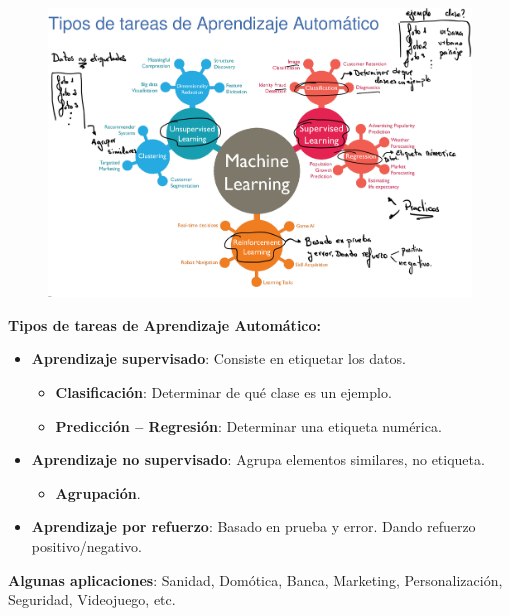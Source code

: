 \documentclass[12pt, twoside, openright]{report} %
\begin{document}
\begin{figure}[H]
	{\includegraphics[scale=.2]{Untitled 2.png}}
\end{figure}
\pagebreak
\textbf{Tipos de tareas de Aprendizaje Automático:}
\begin{itemize}

\item
  \textbf{Aprendizaje supervisado}: Consiste en etiquetar los datos.

  \begin{itemize}
  
  \item
    \textbf{Clasificación}: Determinar de qué clase es un ejemplo.
    
  \item
    \textbf{Predicción -- Regresión}: Determinar una etiqueta numérica.

  \end{itemize}
\item
  \textbf{Aprendizaje no supervisado}: Agrupa elementos similares, no
  etiqueta.

  \begin{itemize}
  
  \item
    \textbf{Agrupación}.
  \end{itemize}
\item
  \textbf{Aprendizaje por refuerzo}: Basado en prueba y error. Dando
  refuerzo positivo/negativo.
\end{itemize}

\textbf{Algunas aplicaciones}: Sanidad, Domótica, Banca, Marketing,
Personalización, Seguridad, Videojuego, etc.
\end{document}
